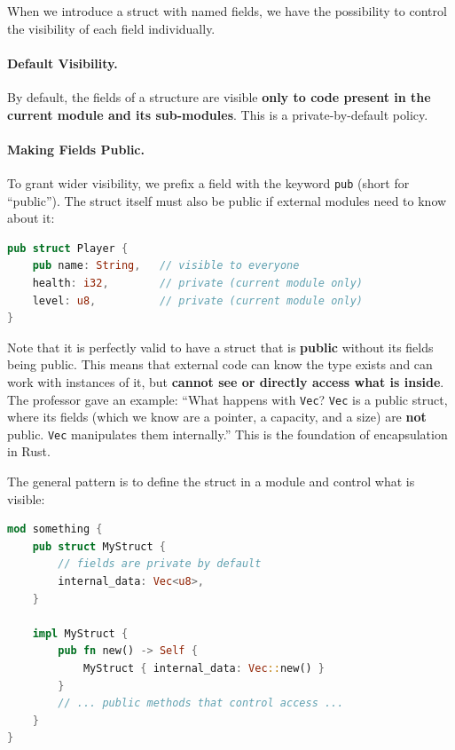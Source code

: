When we introduce a struct with named fields, we have the possibility to control the visibility of each field individually.

\paragraph{Default Visibility.} By default, the fields of a structure are visible \textbf{only to code present in the current module and its sub-modules}. This is a private-by-default policy.

\paragraph{Making Fields Public.} To grant wider visibility, we prefix a field with the keyword \texttt{pub} (short for ``public''). The struct itself must also be public if external modules need to know about it:

\begin{lstlisting}[language=Rust]
pub struct Player {
    pub name: String,   // visible to everyone
    health: i32,        // private (current module only)
    level: u8,          // private (current module only)
}
\end{lstlisting}

\begin{insightbox}
Note that it is perfectly valid to have a struct that is \textbf{public} without its fields being public. This means that external code can know the type exists and can work with instances of it, but \textbf{cannot see or directly access what is inside}. The professor gave an example: ``What happens with \texttt{Vec}? \texttt{Vec} is a public struct, where its fields (which we know are a pointer, a capacity, and a size) are \textbf{not} public. \texttt{Vec} manipulates them internally.'' This is the foundation of encapsulation in Rust.
\end{insightbox}

The general pattern is to define the struct in a module and control what is visible:

\begin{lstlisting}[language=Rust]
mod something {
    pub struct MyStruct {
        // fields are private by default
        internal_data: Vec<u8>,
    }

    impl MyStruct {
        pub fn new() -> Self {
            MyStruct { internal_data: Vec::new() }
        }
        // ... public methods that control access ...
    }
}
\end{lstlisting}

